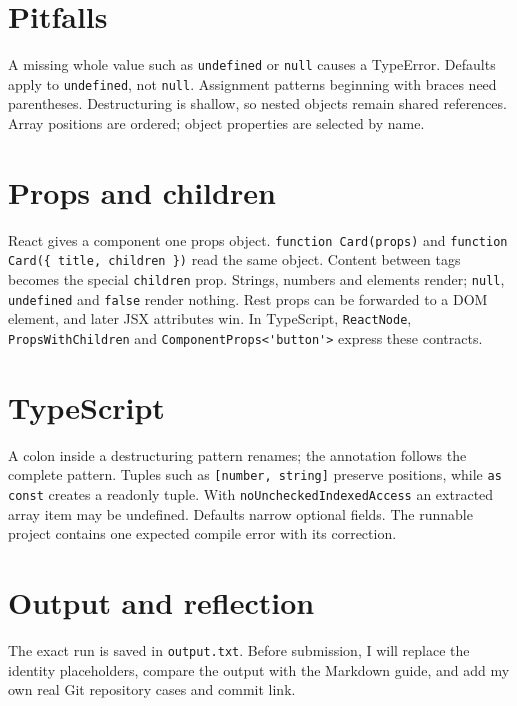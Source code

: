 \documentclass[11pt,a4paper]{article}
\begin{document}
\section{Pitfalls}
A missing whole value such as \lstinline|undefined| or \lstinline|null| causes a TypeError. Defaults apply to \lstinline|undefined|, not \lstinline|null|. Assignment patterns beginning with braces need parentheses. Destructuring is shallow, so nested objects remain shared references. Array positions are ordered; object properties are selected by name.
\section{Props and children}
React gives a component one props object. \lstinline|function Card(props)| and \lstinline|function Card({ title, children })| read the same object. Content between tags becomes the special \lstinline|children| prop. Strings, numbers and elements render; \lstinline|null|, \lstinline|undefined| and \lstinline|false| render nothing. Rest props can be forwarded to a DOM element, and later JSX attributes win. In TypeScript, \lstinline|ReactNode|, \lstinline|PropsWithChildren| and \lstinline|ComponentProps<'button'>| express these contracts.
\section{TypeScript}
A colon inside a destructuring pattern renames; the annotation follows the complete pattern. Tuples such as \lstinline|[number, string]| preserve positions, while \lstinline|as const| creates a readonly tuple. With \lstinline|noUncheckedIndexedAccess| an extracted array item may be undefined. Defaults narrow optional fields. The runnable project contains one expected compile error with its correction.
\section{Output and reflection}
The exact run is saved in \texttt{output.txt}. Before submission, I will replace the identity placeholders, compare the output with the Markdown guide, and add my own real Git repository cases and commit link.
\end{document}
